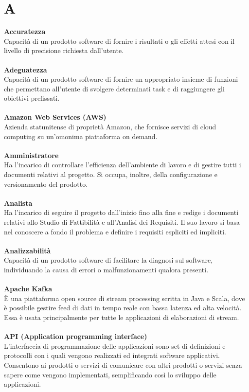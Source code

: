 \section{A}
\textbf{Accuratezza}\\
Capacità di un prodotto software di fornire i risultati o gli effetti attesi con il livello di precisione richiesta
dall'utente.\\ \\
\textbf{Adeguatezza}\\
Capacità di un prodotto software di fornire un appropriato insieme di funzioni che permettano all'utente di svolgere determinati task e di raggiungere gli obiettivi prefissati.\\ \\
\textbf{Amazon Web Services (AWS)}\\
Azienda statunitense di proprietà Amazon, che fornisce servizi di cloud computing su un'omonima piattaforma on demand. \\ \\
\textbf{Amministratore}\\
Ha l'incarico di controllare l'efficienza dell'ambiente di lavoro e di gestire tutti i documenti relativi al progetto. Si occupa, inoltre, della configurazione e versionamento del prodotto.\\ \\
\textbf{Analista}\\
Ha l'incarico di seguire il progetto dall'inizio fino alla fine e redige i documenti relativi allo Studio di Fattibilità e all'Analisi dei Requisiti. Il suo lavoro si basa nel conoscere a fondo il problema e definire i requisiti espliciti ed impliciti.\\ \\
\textbf{Analizzabilità}\\
Capacità di un prodotto software di facilitare la diagnosi sul software, individuando la causa di errori o malfunzionamenti qualora presenti.\\ \\
\textbf{Apache Kafka}\\
È una piattaforma open source di stream processing scritta in Java e Scala, dove è possibile gestire feed di dati in tempo reale con bassa latenza ed alta velocità. Essa è usata principalmente per tutte le applicazioni di elaborazioni di stream.  \\ \\
\textbf{API (Application programming interface)}\\
L'interfaccia di programmazione delle applicazioni sono set di definizioni e protocolli con i quali vengono realizzati ed integrati software applicativi. Consentono ai  prodotti o servizi di comunicare con altri prodotti o servizi senza sapere come vengono implementati, semplificando così lo sviluppo delle applicazioni. \\ \\
